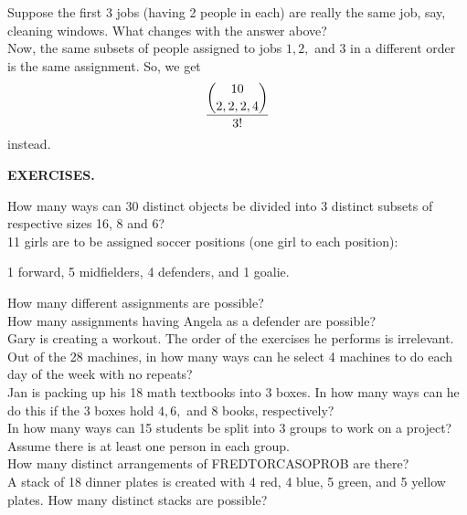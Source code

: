 \documentclass[12pt]{article}
\begin{document}
\noindent Suppose the first 3 jobs (having 2 people in each) are really the same job, say, cleaning windows.  What changes with the answer above?\\


\noindent Now, the same subsets of people assigned to jobs $1,2,$ and $3$ in a different order is the same assignment.  So, we get
$$\dfrac {\displaystyle \displaystyle {10\choose 2,2,2,4}}{3!}$$
instead.



\newpage


\begin{center}{\bf \Large EXERCISES.}\label{problemset3}\end{center}


 How many ways can 30 distinct objects be divided into 3 distinct subsets of respective sizes 16, 8 and 6?\\

 11 girls are to be assigned soccer positions (one girl to each position):

1 forward, 5 midfielders, 4 defenders, and 1 goalie.

\noindent How many different assignments are possible?\\
\noindent How many assignments having Angela as a defender are possible?\\

 Gary is creating a workout. The order of the exercises he performs is irrelevant. Out of the 28 machines, in how many ways can he select 4 machines to do each day of the week with no repeats?\\

 Jan is packing up his 18 math textbooks into 3 boxes. In how many ways can he do this if the 3 boxes hold $4,6,$ and $8$ books, respectively?\\

 In how many ways can 15 students be split into 3 groups to work on a project?  Assume there is at least one person in each group.\\

 How many distinct arrangements of FREDTORCASOPROB are there?\\

 A stack of 18 dinner plates is created with 4 red, 4 blue, 5 green, and 5 yellow plates. How many distinct stacks are possible?\\
\end{document}
